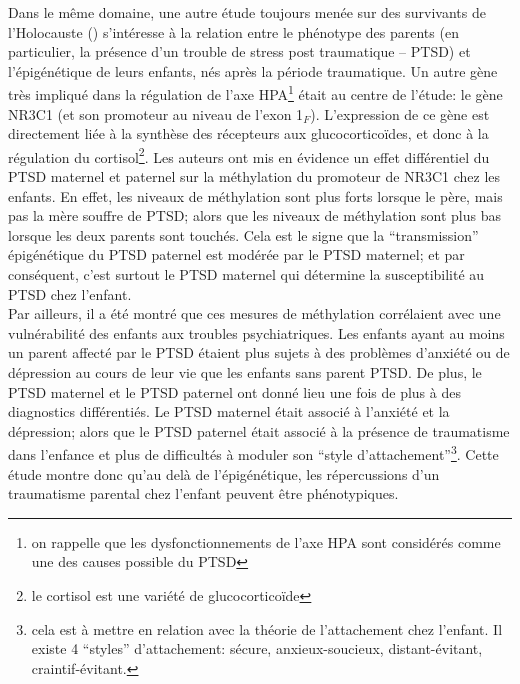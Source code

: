 \documentclass[french]{article}
\begin{document}
				Dans le même domaine, une autre étude toujours menée sur des survivants de l'Holocauste (\cite{yehuda2014}) s'intéresse à la relation entre le phénotype des parents (en particulier, la présence d'un trouble de stress post traumatique -- PTSD) et l'épigénétique de leurs enfants, nés après la période traumatique. Un autre gène très impliqué dans la régulation de l'axe HPA\footnote{on rappelle que les dysfonctionnements de l'axe HPA sont considérés comme une des causes possible du PTSD} était au centre de l'étude: le gène NR3C1 (et son promoteur au niveau de l'exon 1$_F$). L'expression de ce gène est directement liée à la synthèse des récepteurs aux glucocorticoïdes, et donc à la régulation du cortisol\footnote{le cortisol est une variété de glucocorticoïde}. Les auteurs ont mis en évidence un effet différentiel du PTSD maternel et paternel sur la méthylation du promoteur de NR3C1 chez les enfants. En effet, les niveaux de méthylation sont plus forts lorsque le père, mais pas la mère souffre de PTSD; alors que les niveaux de méthylation sont plus bas lorsque les deux parents sont touchés. Cela est le signe que la ``transmission'' épigénétique du PTSD paternel est modérée par le PTSD maternel; et par conséquent, c'est surtout le PTSD maternel qui détermine la susceptibilité au PTSD chez l'enfant.\\
				Par ailleurs, il a été montré que ces mesures de méthylation corrélaient avec une vulnérabilité des enfants aux troubles psychiatriques. Les enfants ayant au moins un parent affecté par le PTSD étaient plus sujets à des problèmes d'anxiété ou de dépression au cours de leur vie que les enfants sans parent PTSD. De plus, le PTSD maternel et le PTSD paternel ont donné lieu une fois de plus à des diagnostics différentiés. Le PTSD maternel était associé à l'anxiété et la dépression; alors que le PTSD paternel était associé à la présence de traumatisme dans l'enfance et plus de difficultés à moduler son ``style d'attachement''\footnote{cela est à mettre en relation avec la théorie de l'attachement chez l'enfant. Il existe 4 ``styles'' d'attachement: sécure, anxieux-soucieux, distant-évitant, craintif-évitant.}. Cette étude montre donc qu'au delà de l'épigénétique, les répercussions d'un traumatisme parental chez l'enfant peuvent être phénotypiques.
\end{document}
